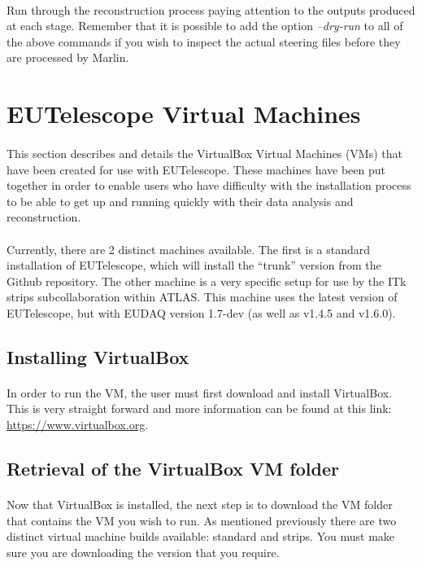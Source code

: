 \documentclass[11pt]{article}
\begin{document}
\paragraph{}
Run through the reconstruction process paying attention to the outputs produced at each stage. Remember that it is possible to add the option \textit{--dry-run} to all of the above commands if you wish to inspect the actual steering files before they are processed by Marlin.
\section{EUTelescope Virtual Machines}
\paragraph{}
This section describes and details the VirtualBox Virtual Machines (VMs) that have been created for use with EUTelescope. These machines have been put together in order to enable users who have difficulty with the installation process to be able to get up and running quickly with their data analysis and reconstruction.
\paragraph{}
Currently, there are 2 distinct machines available. The first is a standard installation of EUTelescope, which will install the ``trunk'' version from the Github repository. The other machine is a very specific setup for use by the ITk strips subcollaboration within ATLAS. This machine uses the latest version of EUTelescope, but with EUDAQ version 1.7-dev (as well as v1.4.5 and v1.6.0).
\subsection{Installing VirtualBox}
\paragraph{}
In order to run the VM, the user must first download and install VirtualBox. This is very straight forward and more information can be found at this link: \url{https://www.virtualbox.org}.
\subsection{Retrieval of the VirtualBox VM folder}
\paragraph{}
Now that VirtualBox is installed, the next step is to download the VM folder that contains the VM you wish to run. As mentioned previously there are two distinct virtual machine builds available: standard and strips. You must make sure you are downloading the version that you require.
\end{document}
